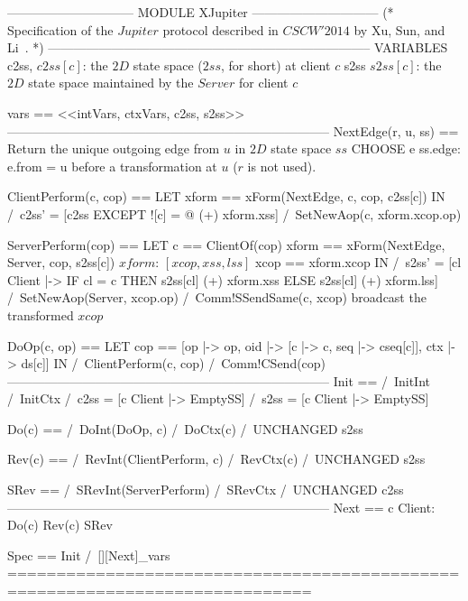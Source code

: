 \documentclass{article}
\begin{document}
\begin{tla}
------------------------------ MODULE XJupiter ------------------------------
(*
Specification of the $Jupiter$ protocol described in $CSCW'2014$ by Xu, Sun, and Li~\cite{Xu:CSCW14}.
*)
-----------------------------------------------------------------------------
VARIABLES c2ss, \* $c2ss[c]$: the $2D$ state space ($2ss$, for short) at client $c$ 
          s2ss  \* $s2ss[c]$: the $2D$ state space maintained by the $Server$ for client $c$

vars == <<intVars, ctxVars, c2ss, s2ss>>
-----------------------------------------------------------------------------
NextEdge(r, u, ss) == \* Return the unique outgoing edge from $u$ in $2D$ state space $ss$ 
    CHOOSE e \in ss.edge: e.from = u \* before a transformation at $u$ ($r$ is not used). 

ClientPerform(c, cop) == 
    LET xform == xForm(NextEdge, c, cop, c2ss[c])
    IN  /\ c2ss' = [c2ss EXCEPT ![c] = @ (+) xform.xss]
        /\ SetNewAop(c, xform.xcop.op)

ServerPerform(cop) == 
    LET c == ClientOf(cop)
    xform == xForm(NextEdge, Server, cop, s2ss[c]) \* $xform$: $[xcop, xss, lss]$
     xcop == xform.xcop
    IN  /\ s2ss' = [cl \in Client |-> IF cl = c THEN s2ss[cl] (+) xform.xss 
                                                ELSE s2ss[cl] (+) xform.lss]
        /\ SetNewAop(Server, xcop.op)
        /\ Comm!SSendSame(c, xcop)  \* broadcast the transformed $xcop$ 

DoOp(c, op) == 
    LET cop == [op |-> op, oid |-> [c |-> c, seq |-> cseq[c]], ctx |-> ds[c]] 
    IN  /\ ClientPerform(c, cop)
        /\ Comm!CSend(cop)
-----------------------------------------------------------------------------
Init == 
    /\ InitInt
    /\ InitCtx
    /\ c2ss = [c \in Client |-> EmptySS]
    /\ s2ss = [c \in Client |-> EmptySS]

Do(c) == 
    /\ DoInt(DoOp, c)
    /\ DoCtx(c)
    /\ UNCHANGED s2ss

Rev(c) == 
    /\ RevInt(ClientPerform, c)
    /\ RevCtx(c)
    /\ UNCHANGED s2ss

SRev == 
    /\ SRevInt(ServerPerform)
    /\ SRevCtx
    /\ UNCHANGED c2ss
-----------------------------------------------------------------------------
Next == 
    \/ \E c \in Client: Do(c) \/ Rev(c)
    \/ SRev

Spec == Init /\ [][Next]_vars
=============================================================================
\end{tla}
\end{document}
